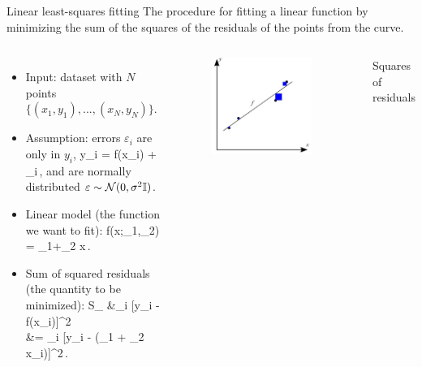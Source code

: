 \documentclass[10pt,aspectratio=169,handout]{beamer}
\begin{document}
\begin{frame}{Linear least-squares fitting}
	The procedure for fitting a {\color{blue}linear function} by minimizing the {\color{blue} sum of the squares of the residuals} of the points from the curve.
	\begin{columns}
			\begin{itemize}[<+->]
				\item Input: dataset with $N$ points $\{(x_1,y_1),...,(x_N,y_N)\}$.
				\item Assumption: errors $\varepsilon_i$ are only in $y_i$,
				\bea
					y_i = f(x_i) + \varepsilon_i\,,
				\eea
				and are normally distributed $\varepsilon\sim \mathcal{N}(0,\sigma^2\mathbb{I})$.
				\item Linear model (the function we want to fit): 
				\bea
					f(x;\beta_1,\beta_2) = \beta_1+\beta_2 x\,.
				\eea
				\item Sum of squared residuals (the quantity to be minimized):
				\bea
					S_ &\equiv \sum_i [y_i - f(x_i)]^2 \\
					&= \sum_i [y_i - (\beta_1 + \beta_2 x_i)]^2\,.
				\eea
			\end{itemize}
		
		\begin{figure}
			\centering
			\includegraphics[width=0.9\textwidth]{fig/sres}
		\end{figure}
	\begin{center}
		Squares of residuals
	\end{center}
	\end{columns}
\end{frame}
\end{document}
